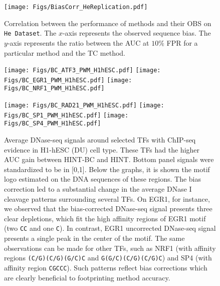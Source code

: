 \documentclass[11pt]{article}
\begin{document}
\begin{figure}[h!]
\centering
\texttt{[image: Figs/BiasCorr\_HeReplication.pdf]}
\caption{Correlation between the performance of methods and their OBS on {\tt He Dataset}. The $x$-axis represents the observed sequence bias. The $y$-axis represents the ratio between the AUC at $10\%$ FPR for a particular method and the TC method. {}}
\label{fig:tcbiasuwk}
\end{figure}

\clearpage

\begin{figure}[t!]
\centering
\centerline{
\texttt{[image: Figs/BC\_ATF3\_PWM\_H1hESC.pdf]}
\texttt{[image: Figs/BC\_EGR1\_PWM\_H1hESC.pdf]}
\texttt{[image: Figs/BC\_NRF1\_PWM\_H1hESC.pdf]} }
\vspace{1.0cm}
\centerline{
\texttt{[image: Figs/BC\_RAD21\_PWM\_H1hESC.pdf]}
\texttt{[image: Figs/BC\_SP1\_PWM\_H1hESC.pdf]}
\texttt{[image: Figs/BC\_SP4\_PWM\_H1hESC.pdf]}
}
\vspace{-0.1cm}
\caption{Average DNase-seq signals around selected TFs with ChIP-seq evidence in H1-hESC (DU) cell type. These TFs had the higher AUC gain between HINT-BC and HINT. {} Bottom panel signals were standardized to be in [0,1]. Below the graphs, it is shown the motif logo estimated on the DNA sequences of these regions. The bias correction led to a substantial change in the average DNase I cleavage patterns surrounding several TFs. On EGR1, for instance, we observed that the bias-corrected DNase-seq signal presents three clear depletions, which fit the high affinity regions of EGR1 motif (two {\tt CC} and one {\tt C}). In contrast, EGR1 uncorrected DNase-seq signal presents a single peak in the center of the motif. The same observations can be made for other TFs, such as NRF1 (with affinity regions {\tt (C/G)(C/G)(G/C)C} and {\tt G(G/C)(C/G)(C/G)C}) and SP4 (with affinity region {\tt CGCCC}). Such patterns reflect bias corrections which are clearly beneficial to footprinting method accuracy.}
\label{fig:lineOBCsignal}
\end{figure}
\end{document}
